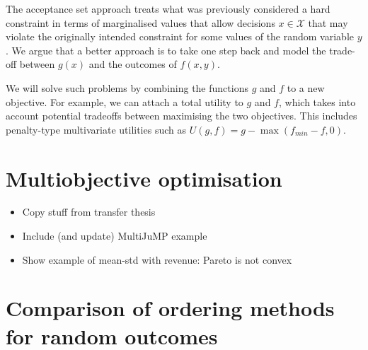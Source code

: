 \documentclass[main.tex]{subfiles}
\begin{document}
The acceptance set approach treats what was previously considered a
hard constraint in terms of marginalised values that allow decisions $x\in\mathcal{X}$
that may violate the originally intended constraint for some values of the random
variable $y$. We argue that a better approach is to take one step back
and model the trade-off between $g(x)$ and the outcomes of $f(x,y)$.

We will solve such problems by combining the functions $g$ and $f$ to
a new objective. For example, we can attach a total utility to $g$ and
$f$, which takes into account potential tradeoffs between maximising
the two objectives. This includes penalty-type multivariate utilities
such as $U(g,f)=g-\max(f_{min}-f,0)$.


\section{Multiobjective optimisation}\label{sec:one_multiobjective}
\begin{itemize}
\item Copy stuff from transfer thesis
\item Include (and update) MultiJuMP example
\item Show example of mean-std with revenue: Pareto is not convex
\end{itemize}

\section{Comparison of ordering methods for random outcomes}\label{sec:one_comparison_orderings}



\biblio{} %
\end{document}

